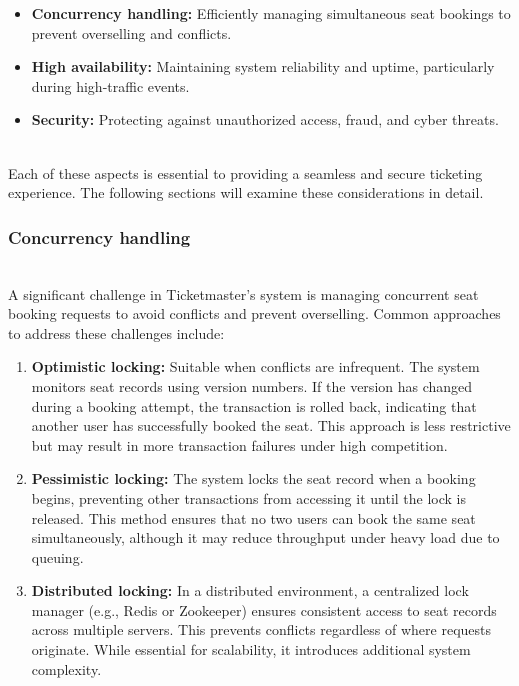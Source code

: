 \begin{itemize}
\item
\protect{}\label{wyPJtC8u6od_B9wxkW4B5}
\textbf{Concurrency handling:} Efficiently managing simultaneous seat bookings to prevent overselling and conflicts.
\item
\protect{}\label{eYwI8U9217_hX7b7yhcfC}
\textbf{High availability:} Maintaining system reliability and uptime, particularly during high-traffic events.
\item
\protect{}\label{QJGd75iNufYykHG-11jc6}
\textbf{Security:} Protecting against unauthorized access, fraud, and cyber threats.
\end{itemize}
\\
Each of these aspects is essential to providing a seamless and secure ticketing experience. The following sections will examine these considerations in detail.

\subsubsection{Concurrency handling}\label{Byktf1NWspJHOX5eUn2qr}
\\
A significant challenge in Ticketmaster's system is managing concurrent seat booking requests to avoid conflicts and prevent overselling. Common approaches to address these challenges include:

\begin{enumerate}
\item
\protect{}\label{GSyNrqJM-0KGZZNXkci9u}
\textbf{Optimistic locking:} Suitable when conflicts are infrequent. The system monitors seat records using version numbers. If the version has changed during a booking attempt, the transaction is rolled back, indicating that another user has successfully booked the seat. This approach is less restrictive but may result in more transaction failures under high competition.
\item
\protect{}\label{5oQMAuNxkJo-qZnmOqdxT}
\textbf{Pessimistic locking:} The system locks the seat record when a booking begins, preventing other transactions from accessing it until the lock is released. This method ensures that no two users can book the same seat simultaneously, although it may reduce throughput under heavy load due to queuing.
\item
\protect{}\label{kL7210_F-MVZNTui8btCd}
\textbf{Distributed locking:} In a distributed environment, a centralized lock manager (e.g., Redis or Zookeeper) ensures consistent access to seat records across multiple servers. This prevents conflicts regardless of where requests originate. While essential for scalability, it introduces additional system complexity.
\end{enumerate}

